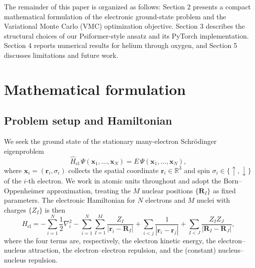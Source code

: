 The remainder of this paper is organized as
follows: Section 2 presents a compact mathematical formulation of the electronic
ground-state problem and the Variational Monte Carlo (VMC) optimization objective.
Section 3 describes the structural choices of our Psiformer-style ansatz and its
PyTorch implementation. Section 4 reports numerical results for helium through oxygen,
and Section 5 discusses limitations and future work.

\section{Mathematical formulation}

\subsection{Problem setup and Hamiltonian}
We seek the ground state of the stationary many-electron Schr\"odinger eigenproblem
\begin{equation}
	\hat{H}_{\mathrm{el}}\,\Psi(\mathbf{x}_{1},\dots,\mathbf{x}_{N})=E\,\Psi(\mathbf{x}_{1},\dots,\mathbf{x}_{N}),
\end{equation}
where $\mathbf{x}_i=(\mathbf{r}_i,\sigma_i)$ collects the spatial coordinate $\mathbf{r}_i\in\mathbb{R}^3$ and spin $\sigma_i\in\{\uparrow,\downarrow\}$ of the $i$-th electron. We work in atomic units throughout and adopt the Born--Oppenheimer approximation, treating the $M$ nuclear positions $\{\mathbf{R}_I\}$ as fixed parameters. The electronic Hamiltonian for $N$ electrons and $M$ nuclei with charges $\{Z_I\}$ is then
\begin{equation}
	\hat{H}_{\mathrm{el}}
	= -\sum_{i=1}^{N}\frac{1}{2}\nabla_i^{2}
	  -\sum_{i=1}^{N}\sum_{I=1}^{M}\frac{Z_I}{|\mathbf{r}_i-\mathbf{R}_I|}
	  +\sum_{i<j}\frac{1}{|\mathbf{r}_i-\mathbf{r}_j|}
	  +\sum_{I<J}\frac{Z_I Z_J}{|\mathbf{R}_I-\mathbf{R}_J|},
\end{equation}
where the four terms are, respectively, the electron kinetic energy, the electron--nucleus attraction, the electron--electron repulsion, and the (constant) nucleus--nucleus repulsion.

